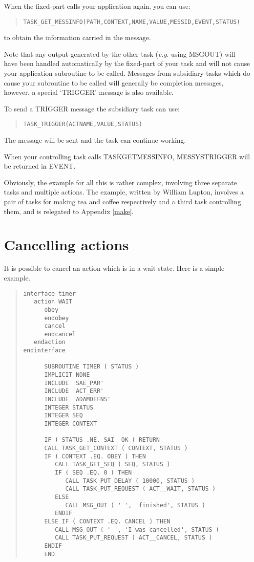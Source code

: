 \documentclass[twoside,11pt]{article}
\newcommand{\xlabel}[1]{}
\renewcommand{\_}{\texttt{\symbol{95}}}
\begin{document}
When the fixed-part calls your application again, you can use:
\small \begin{quote} \begin{verbatim}
TASK_GET_MESSINFO(PATH,CONTEXT,NAME,VALUE,MESSID,EVENT,STATUS) 
\end{verbatim} \end{quote} \normalsize
to obtain the information carried in the message. 

Note that any output generated by the other task ({\em e.g.} using MSG\_OUT) 
will have been handled automatically by the fixed-part of your task and will 
not cause your application subroutine to be called.
Messages from subsidiary tasks which do cause your subroutine to be called 
will generally be completion messages, however, a special `TRIGGER' message is
also available.

To send a TRIGGER message the subsidiary task can use:
\small \begin{quote} \begin{verbatim}
TASK_TRIGGER(ACTNAME,VALUE,STATUS)
\end{verbatim} \end{quote} \normalsize
The message will be sent and the task can continue working.

When your controlling task calls TASK\_GET\_MESSINFO, MESSYS\_\_TRIGGER will
be returned in EVENT.

Obviously, the example for all this is rather complex, involving three 
separate tasks and multiple actions. The example, written by William 
Lupton, involves a pair of tasks for making tea and coffee respectively 
and a third task controlling them, and is relegated to Appendix \ref{make}.

\section{Cancelling actions\xlabel{cancelling_actions}}

It is possible to cancel an action which is in a wait state. Here is a 
simple example.

\small \begin{quote} \begin{verbatim}
interface timer
   action WAIT
      obey
      endobey
      cancel
      endcancel
   endaction
endinterface

      SUBROUTINE TIMER ( STATUS )
      IMPLICIT NONE
      INCLUDE 'SAE_PAR'
      INCLUDE 'ACT_ERR'
      INCLUDE 'ADAMDEFNS'
      INTEGER STATUS
      INTEGER SEQ
      INTEGER CONTEXT

      IF ( STATUS .NE. SAI__OK ) RETURN
      CALL TASK_GET_CONTEXT ( CONTEXT, STATUS )
      IF ( CONTEXT .EQ. OBEY ) THEN
         CALL TASK_GET_SEQ ( SEQ, STATUS )
         IF ( SEQ .EQ. 0 ) THEN
            CALL TASK_PUT_DELAY ( 10000, STATUS )
            CALL TASK_PUT_REQUEST ( ACT__WAIT, STATUS )
         ELSE
            CALL MSG_OUT ( ' ', 'finished', STATUS )
         ENDIF
      ELSE IF ( CONTEXT .EQ. CANCEL ) THEN
         CALL MSG_OUT ( ' ', 'I was cancelled', STATUS )
         CALL TASK_PUT_REQUEST ( ACT__CANCEL, STATUS )
      ENDIF
      END
\end{verbatim} \end{quote} \normalsize
\end{document}
